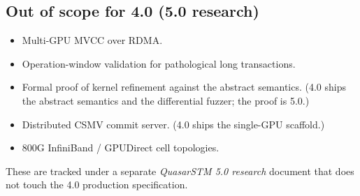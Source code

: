 \subsection{Out of scope for 4.0 (5.0 research)}

\begin{itemize}[leftmargin=2em]
\item Multi-GPU MVCC over RDMA.
\item Operation-window validation for pathological long transactions.
\item Formal proof of kernel refinement against the abstract
      semantics. (4.0 ships the abstract semantics and the
      differential fuzzer; the proof is 5.0.)
\item Distributed CSMV commit server. (4.0 ships the single-GPU
      scaffold.)
\item 800G InfiniBand / GPUDirect cell topologies.
\end{itemize}

These are tracked under a separate \emph{QuasarSTM 5.0 research} document
that does not touch the 4.0 production specification.

